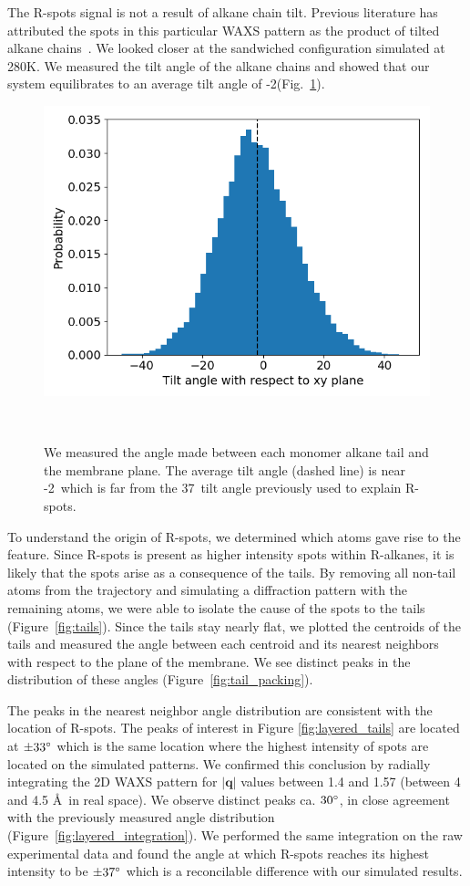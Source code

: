 \documentclass[journal=jpcbfk,manusciprt=article]{achemso}
\begin{document}
  The R-spots signal is not a result of alkane chain tilt. Previous literature
  has attributed the spots in this particular WAXS pattern as the product of tilted alkane
  chains~\cite{feng_scalable_2014}. We looked closer at the sandwiched configuration simulated
  at 280K. We measured the tilt angle of the alkane chains and showed that our system 
  equilibrates to an average tilt angle of -2\degree (Fig.~\ref{fig:tilt}). 
  
  \begin{figure}
  \centering
  \includegraphics[width=0.5\linewidth]{tilt_dist.png}
  \caption{We measured the angle made between each monomer alkane tail and the
	  membrane plane. The average tilt angle (dashed line) is near -2\degree~which is far from 
	  the 37\degree~tilt angle previously used to explain R-spots.}~\label{fig:tilt}
  \end{figure}

  To understand the origin of R-spots, we determined which
  atoms gave rise to the feature. Since R-spots is present as higher intensity
  spots within R-alkanes, it is likely that the spots arise as a consequence of
  the tails. By removing all non-tail atoms from the trajectory and simulating a
  diffraction pattern with the remaining atoms, we were able to isolate the cause of 
  the spots to the tails (Figure~\ref{fig:tails}). Since the tails stay nearly flat, we plotted
  the centroids of the tails and measured the angle between each centroid and its
  nearest neighbors with respect to the plane of the membrane. We see distinct
  peaks in the distribution of these angles (Figure~\ref{fig:tail_packing}).

  The peaks in the nearest neighbor angle distribution are consistent with the
  location of R-spots. The peaks of interest in Figure \ref{fig:layered_tails}
  are located at $\pm 33 \degree$ which is the same location where the highest
  intensity of spots are located on the simulated patterns. We confirmed this 
  conclusion by radially integrating the 2D WAXS pattern for 
  $\left|\mathbf{q}\right|$ values between 1.4 and 1.57 (between 4
  and 4.5 \AA~in real space). We observe distinct peaks ca. $30
  \degree$, in close agreement with the previously measured angle distribution
  (Figure~\ref{fig:layered_integration}). We performed the same integration on
  the raw experimental data and found the angle at which R-spots reaches its
  highest intensity to be $\pm 37 \degree$ which is a reconcilable difference
  with our simulated results.
\end{document}
